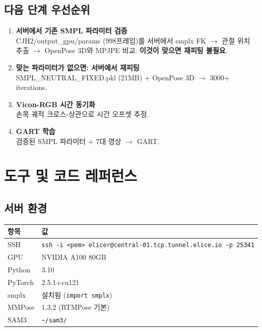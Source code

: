 \documentclass[11pt, a4paper]{report}
\begin{document}
\section{다음 단계 우선순위}

\begin{summary}[title={즉시 실행할 작업 (우선순위 순)}]
\begin{enumerate}[leftmargin=*]
  \item \textbf{서버에서 기존 SMPL 파라미터 검증}\\
    CJH2/output\_gpu/params (998프레임)를 서버에서 smplx FK $\rightarrow$ 관절 위치 추출 $\rightarrow$ OpenPose 3D와 MPJPE 비교.
    \textbf{이것이 맞으면 재피팅 불필요}.

  \item \textbf{맞는 파라미터가 없으면: 서버에서 재피팅}\\
    SMPL\_NEUTRAL\_FIXED.pkl (21MB) + OpenPose 3D $\rightarrow$ 3000+ iterations.

  \item \textbf{Vicon-RGB 시간 동기화}\\
    손목 궤적 크로스-상관으로 시간 오프셋 추정.

  \item \textbf{GART 학습}\\
    검증된 SMPL 파라미터 + 7대 영상 $\rightarrow$ GART.
\end{enumerate}
\end{summary}


\chapter{도구 및 코드 레퍼런스}

\section{서버 환경}

\begin{table}[H]
\centering
\renewcommand{\arraystretch}{1.3}
\begin{tabular}{ll}
\toprule
\textbf{항목} & \textbf{값} \\
\midrule
SSH & \texttt{ssh -i <pem> elicer@central-01.tcp.tunnel.elice.io -p 25341} \\
GPU & NVIDIA A100 80GB \\
Python & 3.10 \\
PyTorch & 2.5.1+cu121 \\
smplx & 설치됨 (\texttt{import smplx}) \\
MMPose & 1.3.2 (RTMPose 기본) \\
SAM3 & \texttt{{\textasciitilde}/sam3/} \\
\bottomrule
\end{tabular}
\end{table}
\end{document}
